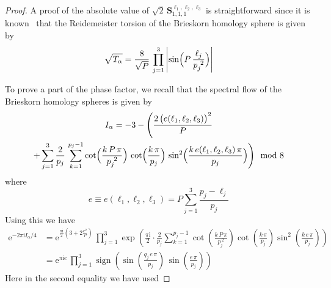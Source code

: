 \documentclass[12pt,reqno]{amsart}
\numberwithin{equation}{section}
\DeclareMathOperator{\sign}{sign}
\DeclareMathOperator{\CS}{CS}
\begin{document}
\begin{proof}
A proof of the absolute value of
$\sqrt{2} \,
\mathbf{S}_{1,1,1}^{\ell_1,\ell_2,\ell_3}$
is straightforward since
it is known~\cite{DFreed92a} that
the Reidemeister torsion of the
Brieskorn homology sphere is given by
\begin{equation}
  \sqrt{T_\alpha}
  =
  \frac{8}{\sqrt{P}} \,
  \prod_{j=1}^3
  \left|
    \sin \Bigl(
    P \,
    \frac{\ell_j}{p_j^{~2}}
    \Bigr)
  \right|
\end{equation}

To prove a part of the phase factor,
we recall that
the spectral flow of the Brieskorn homology spheres is given
by~\cite{FintuStern90a}
\begin{multline}
  I_\alpha
  =
  -3 - 
  \Biggl(
    \frac{2 \,
      \bigl(e (\ell_1, \ell_2, \ell_3) \bigr)^2
    }{P}
    \\
    +
    \sum_{j=1}^3
    \frac{2}{p_j} \,
    \sum_{k=1}^{p_j-1}
    \cot
    \Bigl( \frac{k \, P  \, \pi}{p_j^{~2}} \Bigr) \,
    \cot
    \Bigl( \frac{k \, \pi}{p_j} \Bigr) \,
    \sin^2
    \Bigl( \frac{k \,
      e(\ell_1, \ell_2, \ell_3)
      \, \pi}{p_j} \Bigr) 
  \Biggr)
  \mod 8
  \label{spectral}
\end{multline}
where
\begin{equation}
  e \equiv
  e(\ell_1,\ell_2, \ell_3)
  = P \sum_{j=1}^3 \frac{p_j - \ell_j}{p_j}
\end{equation}
Using this we have
\begin{align*}
  \mathrm{e}^{-2 \pi \mathrm{i} I_\alpha/4}
  & =
  \mathrm{e}^{\frac{\pi \mathrm{i}}{2}
    \left( 3 + 2 \frac{e^2}{P} \right)
  } \,
  \prod_{j=1}^3 \exp
  \left(
    \frac{\pi \mathrm{i}}{2} \cdot
    \frac{2}{p_j}
    \sum_{k=1}^{p_j-1}
    \cot
    \left(
      \frac{k \, P \, \pi}{p_j^{~2}}  
    \right)
    \cot
    \left(
      \frac{k \, \pi}{p_j}
    \right)
    \sin^2
    \left(
      \frac{k \, e \, \pi}{p_j} 
    \right)
  \right)
  \\
  & =
  \mathrm{e}^{\pi \mathrm{i} e}
  \,
  \prod_{j=1}^3
  \sign
  \left(
    \sin \left( \frac{q_j \, e \, \pi}{p_j}  \right)
    \,
    \sin \left( \frac{ e \, \pi}{p_j}  \right)
  \right)
\end{align*}
Here in the second equality we have used

\end{proof}
\end{document}
